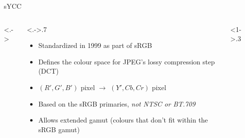 \documentclass[aspectratio=169,usepdftitle=false]{fireshonks}
\begin{document}
\begin{frame}{sYCC}
    \begin{columns}<.->
        \begin{column}<.->{.7\textwidth}
            \begin{itemize}
                \item Standardized in 1999 as part of sRGB \autocite{srgb2002}
                \item Defines the colour space for JPEG's lossy compression step (DCT)
                \item $(R', G', B')$ pixel $\rightarrow$ $(Y', Cb, Cr)$ pixel
                \item Based on the sRGB primaries, \emph{not NTSC or BT.709}
                \item Allows extended gamut (colours that don't fit within the sRGB gamut)
            \end{itemize}
        \end{column}
        \begin{column}<1->{.3\textwidth}
        \end{column}
    \end{columns}
\end{frame}
\end{document}
